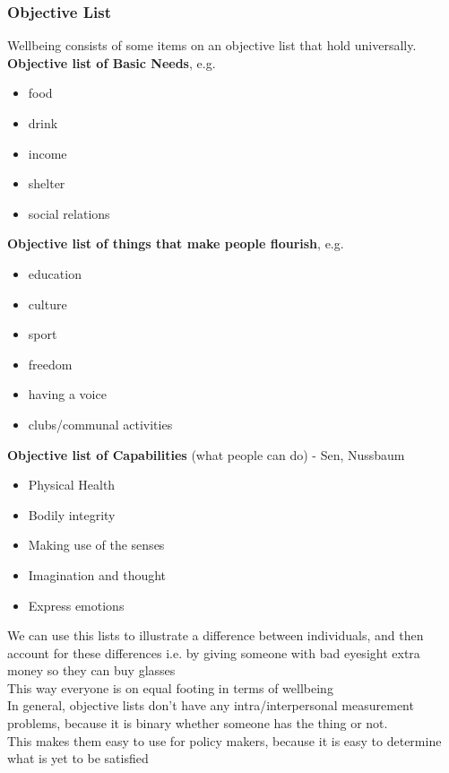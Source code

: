 \documentclass{article}
\begin{document}
        \subsubsection{Objective List}
        Wellbeing consists of some items on an objective list that hold universally.
        \\\textbf{Objective list of Basic Needs}, e.g.
        \begin{itemize}
            \item food
            \item drink
            \item income
            \item shelter
            \item social relations
        \end{itemize}{}
        \bigbreak \textbf{Objective list of things that make people flourish}, e.g.
        \begin{itemize}
            \item education
            \item culture
            \item sport
            \item freedom
            \item having a voice
            \item clubs/communal activities
        \end{itemize}
        \bigbreak \textbf{Objective list of Capabilities} (what people can do) - Sen, Nussbaum
        \begin{itemize}
            \item Physical Health
            \item Bodily integrity
            \item Making use of the senses
            \item Imagination and thought
            \item Express emotions
        \end{itemize}{}
        We can use this lists to illustrate a difference between individuals, and then account for these differences i.e. by giving someone with bad eyesight extra money so they can buy glasses
        \\This way everyone is on equal footing in terms of wellbeing
        \\In general, objective lists don't have any intra/interpersonal measurement problems, because it is binary whether someone has the thing or not.
        \\This makes them easy to use for policy makers, because it is easy to determine what is yet to be satisfied
\end{document}
